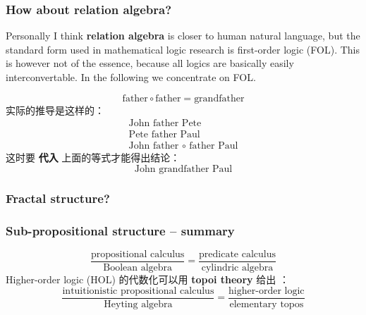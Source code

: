\documentclass[orivec]{llncs}
\newcommand{\emp}[1]{\textbf{\textcolor{Cerulean}{#1}}}
\begin{document}
\subsubsection{How about relation algebra?}

Personally I think \textbf{relation algebra} \cite{Schmidt2010} \cite{Maddux2006} is closer to human natural language, but the standard form used in mathematical logic research is first-order logic (FOL).  This is however not of the essence, because all logics are basically easily interconvertable.  In the following we concentrate on FOL.

\begin{equation}
 \mbox{father} \circ \mbox{father} = \mbox{grandfather}
\end{equation}
实际的推导是这样的：
\begin{eqnarray}
\mbox{John father Pete} \nonumber \\
\mbox{Pete father Paul} \nonumber \\
\mbox{John father $\circ$ father Paul} 
\end{eqnarray}
这时要 \emp{代入} 上面的等式才能得出结论：
\begin{equation}
\mbox{John grandfather Paul}
\end{equation}

\subsubsection{Fractal structure?}

\subsubsection{Sub-propositional structure -- summary}

\begin{equation}
\frac{\mbox{propositional calculus}}{\mbox{Boolean algebra}} = \frac{\mbox{predicate calculus}}{\mbox{cylindric algebra}}
\end{equation}
Higher-order logic (HOL) 的代数化可以用 \emp{topoi theory} 给出 \cite{Lambek1988} \cite{MacLane1992}：
\begin{equation}
\frac{\mbox{intuitionistic propositional calculus}}{\mbox{Heyting algebra}} = \frac{\mbox{higher-order logic}}{\mbox{elementary topos}}
\end{equation}
\end{document}
